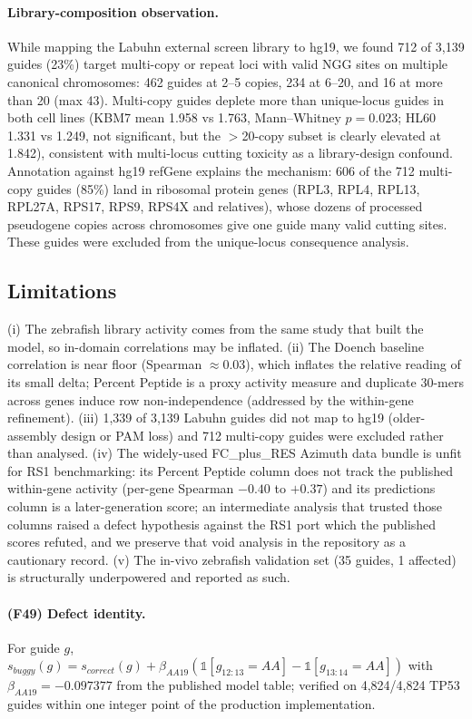 \paragraph{Library-composition observation.} 
While mapping the Labuhn external screen library to hg19, we found 712 of 3,139 guides (23\%) target multi-copy or repeat loci with valid NGG sites on multiple canonical chromosomes: 462 guides at 2--5 copies, 234 at 6--20, and 16 at more than 20 (max 43). Multi-copy guides deplete more than unique-locus guides in both cell lines (KBM7 mean 1.958 vs 1.763, Mann--Whitney $p=0.023$; HL60 1.331 vs 1.249, not significant, but the $>$20-copy subset is clearly elevated at 1.842), consistent with multi-locus cutting toxicity as a library-design confound. Annotation against hg19 refGene explains the mechanism: 606 of the 712 multi-copy guides (85\%) land in ribosomal protein genes (RPL3, RPL4, RPL13, RPL27A, RPS17, RPS9, RPS4X and relatives), whose dozens of processed pseudogene copies across chromosomes give one guide many valid cutting sites. These guides were excluded from the unique-locus consequence analysis.
\subsection{Limitations}
(i) The zebrafish library activity comes from the same study that built the model, so in-domain correlations may be inflated. (ii) The Doench baseline correlation is near floor (Spearman $\approx$0.03), which inflates the relative reading of its small delta; Percent Peptide is a proxy activity measure and duplicate 30-mers across genes induce row non-independence (addressed by the within-gene refinement). (iii) 1,339 of 3,139 Labuhn guides did not map to hg19 (older-assembly design or PAM loss) and 712 multi-copy guides were excluded rather than analysed. (iv) The widely-used FC\_plus\_RES Azimuth data bundle is unfit for RS1 benchmarking: its Percent Peptide column does not track the published within-gene activity (per-gene Spearman $-0.40$ to $+0.37$) and its predictions column is a later-generation score; an intermediate analysis that trusted those columns raised a defect hypothesis against the RS1 port which the published scores refuted, and we preserve that void analysis in the repository as a cautionary record. (v) The in-vivo zebrafish validation set (35 guides, 1 affected) is structurally underpowered and reported as such.
\paragraph{(F49) Defect identity.} For guide $g$, $s_{buggy}(g)=s_{correct}(g)+\beta_{AA19}(\mathbb 1[g_{12:13}=AA]-\mathbb 1[g_{13:14}=AA])$ with $\beta_{AA19}=-0.097377$ from the published model table; verified on 4,824/4,824 TP53 guides within one integer point of the production implementation.
